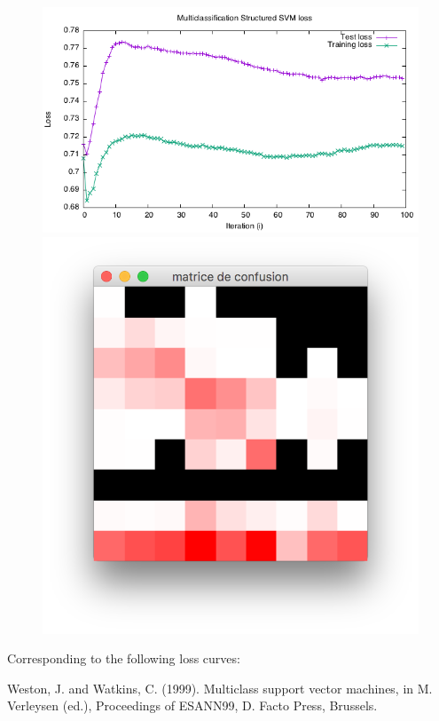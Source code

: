 \documentclass[a4paper,10pt]{article}
\begin{document}
\begin{figure}
\includegraphics[width=0.5\linewidth]{pic/MultiClassification_Loss2}
\includegraphics[width=0.5\linewidth]{pic/mc_cm}
\end{figure}
Corresponding to the following loss curves:

\medskip

\begin{thebibliography}{9}

\bibitem{}
Weston, J. and Watkins, C. (1999). Multiclass support vector machines, in
M. Verleysen (ed.), Proceedings of ESANN99, D. Facto Press, Brussels.

\end{thebibliography}
\end{document}

